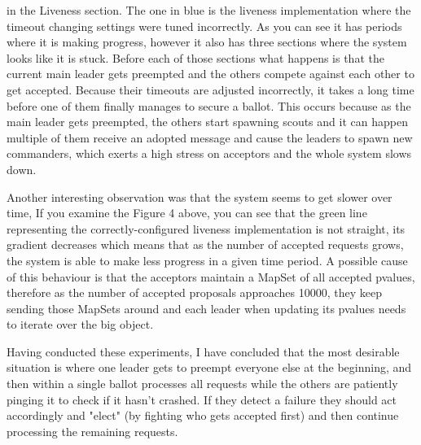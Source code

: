 \documentclass[11pt]{article}
\begin{document}
in the Liveness section. The one in blue is the liveness implementation where the
timeout changing settings were tuned incorrectly. As you can see it has periods
where it is making progress, however it also has three sections where the system
looks like it is stuck. Before each of those sections what happens is that the current
main leader gets preempted and the others compete against each other to get accepted.
Because their timeouts are adjusted incorrectly, it takes a long time before one of
them finally manages to secure a ballot. This occurs because as the main leader gets
preempted, the others start spawning scouts and it can happen multiple of them receive
an adopted message and cause the leaders to spawn new commanders, which exerts a high
stress on acceptors and the whole system slows down.

Another interesting observation was that the system seems to get slower over time,
If you examine the Figure 4 above, you can see that the green line representing
the correctly-configured liveness implementation is not straight, its gradient decreases
which means that as the number of accepted requests grows, the system is able to
make less progress in a given time period. A possible cause of this behaviour
is that the acceptors maintain a MapSet of all accepted pvalues, therefore as the
number of accepted proposals approaches 10000, they keep sending those MapSets around
and each leader when updating its pvalues needs to iterate over the big object.

Having conducted these experiments, I have concluded that the most desirable
situation is where one leader gets to preempt everyone else at the beginning, and
then within a single ballot processes all requests while the others are patiently
pinging it to check if it hasn't crashed. If they detect a failure they should
act accordingly and "elect" (by fighting who gets accepted first) and then continue
processing the remaining requests.
\end{document}
